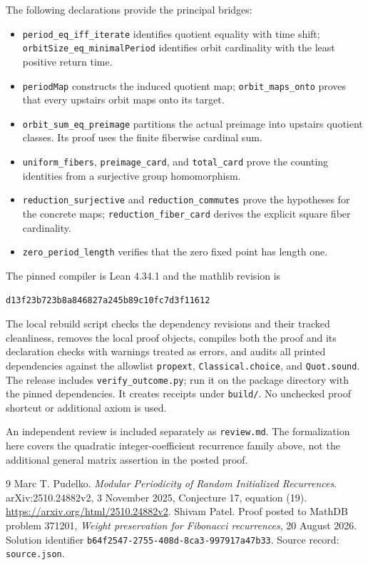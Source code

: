 \documentclass[11pt]{article}
\begin{document}
The following declarations provide the principal bridges:
\begin{itemize}
\item \nolinkurl{period_eq_iff_iterate} identifies quotient equality with time shift;
\nolinkurl{orbitSize_eq_minimalPeriod} identifies orbit cardinality with the least
positive return time.
\item \nolinkurl{periodMap} constructs the induced quotient map;
\nolinkurl{orbit_maps_onto} proves that every upstairs orbit maps onto its target.
\item \nolinkurl{orbit_sum_eq_preimage} partitions the actual preimage into
upstairs quotient classes. Its proof uses the finite fiberwise cardinal sum.
\item \nolinkurl{uniform_fibers}, \nolinkurl{preimage_card}, and \nolinkurl{total_card}
prove the counting identities from a surjective group homomorphism.
\item \nolinkurl{reduction_surjective} and \nolinkurl{reduction_commutes} prove the
hypotheses for the concrete maps; \nolinkurl{reduction_fiber_card} derives the
explicit square fiber cardinality.
\item \nolinkurl{zero_period_length} verifies that the zero fixed point has
length one.
\end{itemize}

The pinned compiler is Lean 4.34.1 and the mathlib revision is
\begin{center}\small\texttt{d13f23b723b8a846827a245b89c10fc7d3f11612}\end{center}
The local rebuild script checks the dependency revisions and their tracked
cleanliness, removes the local proof objects, compiles both the proof and
its declaration checks with warnings treated as errors, and audits all
printed dependencies against the allowlist
\nolinkurl{propext}, \nolinkurl{Classical.choice}, and \nolinkurl{Quot.sound}.
The release includes \nolinkurl{verify_outcome.py}; run it on the package directory with the pinned dependencies. It creates receipts under \nolinkurl{build/}.
No unchecked proof shortcut or additional axiom is used.

An independent review is included separately as \nolinkurl{review.md}. The formalization here
covers the quadratic integer-coefficient recurrence family above, not the
additional general matrix assertion in the posted proof.

\begin{thebibliography}{9}
Marc T. Pudelko.
\emph{Modular Periodicity of Random Initialized Recurrences}.
arXiv:2510.24882v2, 3 November 2025, Conjecture 17, equation (19).
\url{https://arxiv.org/html/2510.24882v2}.
Shivam Patel.
Proof posted to MathDB problem 371201, \emph{Weight preservation for Fibonacci
recurrences}, 20 August 2026.
Solution identifier \nolinkurl{b64f2547-2755-408d-8ca3-997917a47b33}.
Source record: \nolinkurl{source.json}.
\end{thebibliography}
\end{document}

